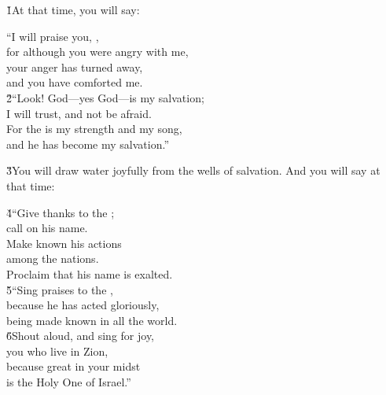 \begin{poetry}
\poeml {}
\v{1}At that time, you will say:
\end{poetry}

\begin{poetry}
\poeml ``I will praise you, , \\
\poemll    for although you were angry with me, \\
\poeml your anger has turned away, \\
\poemll    and you have comforted me. \\
\poeml \v{2}``Look! God---yes God---is my salvation; \\
\poemll    I will trust, and not be afraid. \\
\poeml For the  is my strength and my song, \\
\poemll    and he has become my salvation.''
\end{poetry}

\v{3}You will draw water joyfully from the wells of salvation. And you will say at that time:

\begin{poetry}
\poeml \v{4}``Give thanks to the ; \\
\poemll    call on his name. \\
\poeml Make known his actions \\
\poemll    among the nations. \\
\poemlll       Proclaim that his name is exalted. \\
\poeml \v{5}``Sing praises to the , \\
\poemll    because he has acted gloriously, \\
\poemlll       being made known in all the world. \\
\poeml \v{6}Shout aloud, and sing for joy, \\
\poemll    you who live in Zion, \\
\poeml because great in your midst \\
\poemll    is the Holy One of Israel.''
\end{poetry}

